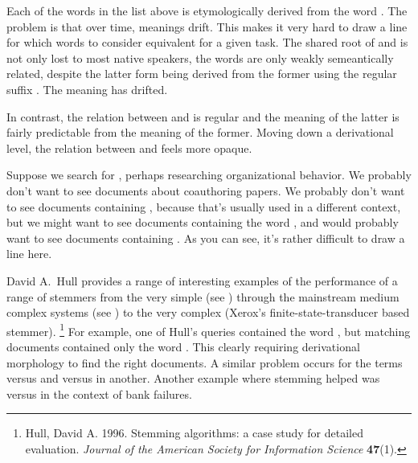 Each of the words in the list above is etymologically derived from the
word .  The problem is that over time, meanings
drift.  This makes it very hard to draw a line for which words to
consider equivalent for a given task.  The shared root of
 and  is not only lost to most
native speakers, the words are only weakly semeantically related,
despite the latter form being derived from the former using the
regular suffix .  The meaning has drifted.  

In contrast, the relation between  and
 is regular and the meaning of the latter
is fairly predictable from the meaning of the former.  Moving down a
derivational level, the relation between  and
 feels more opaque.  

Suppose we search for , perhaps researching
organizational behavior.  We probably don't want to see documents
about coauthoring papers.  We probably don't want to see documents
containing , because that's usually
used in a different context, but we might want to see documents
containing the word , and would probably
want to see documents containing
.
As you can see, it's rather difficult to draw a line here. 

David A.~Hull provides a range of interesting examples of the
performance of a range of stemmers from the very simple (see
) through the mainstream medium complex
systems (see ) to the very complex (Xerox's
finite-state-transducer based stemmer).%
%
\footnote{Hull, David A. 1996. 
Stemming algorithms: a case study for detailed evaluation.
{\it Journal of the American Society for Information Science} {\bf
47}(1).}
%
For example, one of Hull's queries contained the word
, but matching documents
contained only the word .  This clearly
requiring derivational morphology to find the right documents. A
similar problem occurs for the terms 
versus  and  versus  in another.
Another example where stemming helped was 
versus  in the context of bank failures.

